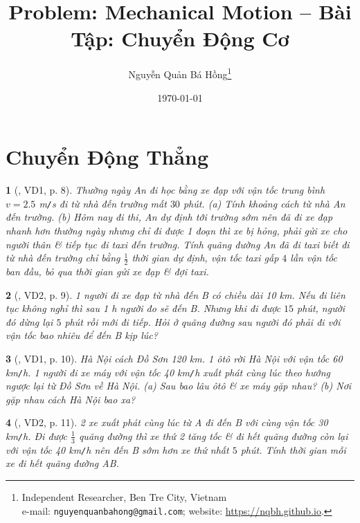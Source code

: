 \documentclass{article}
\title{Problem: Mechanical Motion -- Bài Tập: Chuyển Động Cơ}
\author{Nguyễn Quản Bá Hồng\footnote{Independent Researcher, Ben Tre City, Vietnam\\e-mail: \texttt{nguyenquanbahong@gmail.com}; website: \url{https://nqbh.github.io}.}}
\date{\today}
\newtheorem{baitoan}{}
\begin{document}
\maketitle
\tableofcontents


\section{Chuyển Động Thẳng}

\begin{baitoan}[\cite{Van_Quyen_Hanh_Nhu_10_chuyen_Ly}, VD1, p. 8]
	Thường ngày An đi học bằng xe đạp với vận tốc trung bình $v = 2.5$ {\rm m{\tt/}s} đi từ nhà đến trường mất $30$ phút. (a) Tính khoảng cách từ nhà An đến trường. (b) Hôm nay đi thi, An dự định tới trường sớm nên đã đi xe đạp nhanh hơn thường ngày nhưng chỉ đi được 1 đoạn thì xe bị hỏng, phải gửi xe cho người thân \& tiếp tục đi taxi đến trường. Tính quãng đường An đã đi taxi biết đi từ nhà đến trường chỉ bằng $\frac{1}{2}$ thời gian dự định, vận tốc taxi gấp $4$ lần vận tốc ban đầu, bỏ qua thời gian gửi xe đạp \& đợi taxi.
\end{baitoan}

\begin{baitoan}[\cite{Van_Quyen_Hanh_Nhu_10_chuyen_Ly}, VD2, p. 9]
	1 người đi xe đạp từ nhà đến B có chiều dài {\rm10 km}. Nếu đi liên tục không nghỉ thì sau {\rm1 h} người đo sẽ đến B. Nhưng khi đi được $15$ phút, người đó dừng lại $5$ phút rồi mới đi tiếp. Hỏi ở quãng đường sau người đó phải đi với vận tốc bao nhiêu để đến B kịp lúc?
\end{baitoan}

\begin{baitoan}[\cite{Van_Quyen_Hanh_Nhu_10_chuyen_Ly}, VD1, p. 10]
	Hà Nội cách Đồ Sơn {\rm120 km}. 1 ôtô rời Hà Nội với vận tốc {\rm60 km{\tt/}h}. 1 người đi xe máy với vận tốc {\rm40 km{\tt/}h} xuất phát cùng lúc theo hướng ngược lại từ Đồ Sơn về Hà Nội. (a) Sau bao lâu ôtô \& xe máy gặp nhau? (b) Nơi gặp nhau cách Hà Nội bao xa?
\end{baitoan}

\begin{baitoan}[\cite{Van_Quyen_Hanh_Nhu_10_chuyen_Ly}, VD2, p. 11]
	2 xe xuất phát cùng lúc từ A đi đến B với cùng vận tốc {\rm30 km{\tt/}h}. Đi được $\frac{1}{3}$ quãng đường thì xe thứ 2 tăng tốc \& đi hết quãng đường còn lại với vận tốc {\rm40 km{\tt/}h} nên đến B sớm hơn xe thứ nhất $5$ phút. Tính thời gian mỗi xe đi hết quãng đường AB.
\end{baitoan}
\end{document}
